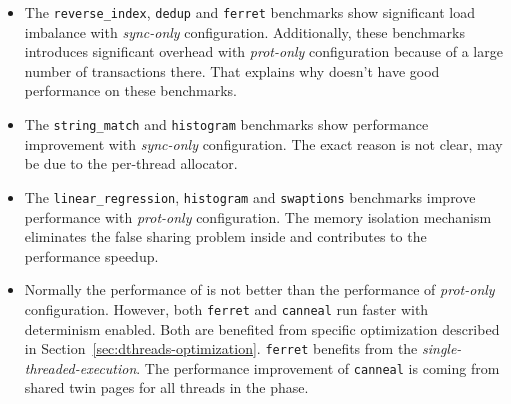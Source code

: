 \begin{itemize}

\item
The \texttt{reverse\_index}, \texttt{dedup} and \texttt{ferret} benchmarks show significant load imbalance with {\it sync-only} configuration. Additionally, these benchmarks introduces significant overhead with {\it prot-only} configuration because of a large number of transactions there. That explains why \dthreads{} doesn't have good performance on these benchmarks.

\item
The \texttt{string\_match} and \texttt{histogram} benchmarks show performance improvement with {\it sync-only} configuration. The exact reason is not clear, may be due to the per-thread allocator. 

\item
The \texttt{linear\_regression}, \texttt{histogram} and \texttt{swaptions} benchmarks improve performance with {\it prot-only} configuration. The memory isolation mechanism eliminates the false sharing problem inside and contributes to the performance speedup.

\item
Normally the performance of \dthreads{} is not better than the performance of {\it prot-only} configuration. However, both \texttt{ferret} and \texttt{canneal} run faster with determinism enabled. Both are benefited from specific optimization described in Section~\ref{sec:dthreads-optimization}. \texttt{ferret} benefits from the \emph{single-threaded-execution}. The performance improvement of \texttt{canneal} is coming from shared twin pages for all threads in the phase.

\end{itemize}






